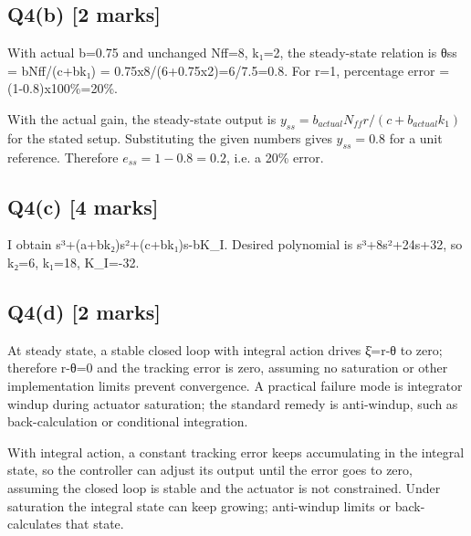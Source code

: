 \documentclass[11pt,a4paper]{article}
\begin{document}
\subsection*{Q4(b) \hfill [2 marks]}

With actual b=0.75 and unchanged Nff=8, k₁=2, the steady-state relation is θss = bNff/(c+bk₁) = 0.75x8/(6+0.75x2)=6/7.5=0.8.
For r=1, percentage error = (1-0.8)x100\%=20\%.\par\smallskip With the actual gain, the steady-state output is $y_{ss}=b_{actual}N_{ff}r/ (c+b_{actual}k_1)$ for the stated setup. Substituting the given numbers gives $y_{ss}=0.8$ for a unit reference. Therefore $e_{ss}=1-0.8=0.2$, i.e. a 20\% error.

\subsection*{Q4(c) \hfill [4 marks]}

I obtain s³+(a+bk₂)s²+(c+bk₁)s-bK\_I.
Desired polynomial is s³+8s²+24s+32, so k₂=6, k₁=18, K\_I=-32.

\subsection*{Q4(d) \hfill [2 marks]}

At steady state, a stable closed loop with integral action drives ξ̇=r-θ to zero; therefore r-θ=0 and the tracking error is zero, assuming no saturation or other implementation limits prevent convergence.
A practical failure mode is integrator windup during actuator saturation; the standard remedy is anti-windup, such as back-calculation or conditional integration.\par\smallskip With integral action, a constant tracking error keeps accumulating in the integral state, so the controller can adjust its output until the error goes to zero, assuming the closed loop is stable and the actuator is not constrained. Under saturation the integral state can keep growing; anti-windup limits or back-calculates that state.
\end{document}
